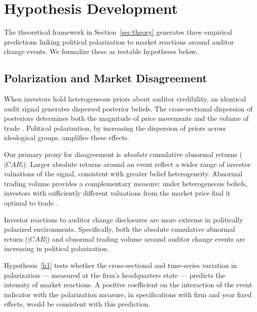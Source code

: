 
\section{Hypothesis Development}
\label{sec:hypotheses}

The theoretical framework in Section~\ref{sec:theory} generates three empirical
predictions linking political polarization to market reactions around auditor
change events. We formalize these as testable hypotheses below.

\subsection{Polarization and Market Disagreement}

When investors hold heterogeneous priors about auditor credibility, an identical
audit signal generates dispersed posterior beliefs. The cross-sectional dispersion
of posteriors determines both the magnitude of price movements and the volume of
trade \citep{kandel1995, harris1993}. Political polarization, by increasing the
dispersion of priors across ideological groups, amplifies these effects.

Our primary proxy for disagreement is \textit{absolute} cumulative abnormal
returns ($|CAR|$). Larger absolute returns around an event reflect a wider range
of investor valuations of the signal, consistent with greater belief
heterogeneity. Abnormal trading volume provides a complementary measure: under
heterogeneous beliefs, investors with sufficiently different valuations from the
market price find it optimal to trade \citep{harris1993}.

\begin{hyp}
    \label{h1}
    Investor reactions to auditor change disclosures are more extreme in
    politically polarized environments. Specifically, both the absolute
    cumulative abnormal return ($|CAR|$) and abnormal trading volume around
    auditor change events are increasing in political polarization.
\end{hyp}

Hypothesis~\ref{h1} tests whether the cross-sectional and time-series variation
in polarization — measured at the firm's headquarters state — predicts the
intensity of market reactions. A positive coefficient on the interaction of the
event indicator with the polarization measure, in specifications with firm and
year fixed effects, would be consistent with this prediction.

